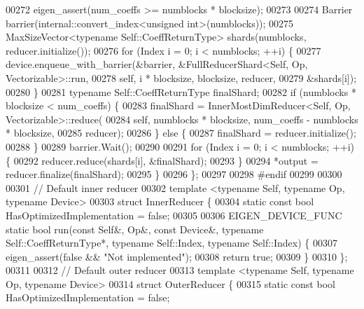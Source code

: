 \begin{DoxyCode}
00272     eigen\_assert(num\_coeffs >= numblocks * blocksize);
00273 
00274     Barrier barrier(internal::convert\_index<unsigned int>(numblocks));
00275     MaxSizeVector<typename Self::CoeffReturnType> shards(numblocks, reducer.initialize());
00276     \textcolor{keywordflow}{for} (Index i = 0; i < numblocks; ++i) \{
00277       device.enqueue\_with\_barrier(&barrier, &FullReducerShard<Self, Op, Vectorizable>::run,
00278                                   \textcolor{keyword}{self}, i * blocksize, blocksize, reducer,
00279                                   &shards[i]);
00280     \}
00281     \textcolor{keyword}{typename} Self::CoeffReturnType finalShard;
00282     \textcolor{keywordflow}{if} (numblocks * blocksize < num\_coeffs) \{
00283       finalShard = InnerMostDimReducer<Self, Op, Vectorizable>::reduce(
00284           \textcolor{keyword}{self}, numblocks * blocksize, num\_coeffs - numblocks * blocksize,
00285           reducer);
00286     \} \textcolor{keywordflow}{else} \{
00287       finalShard = reducer.initialize();
00288     \}
00289     barrier.Wait();
00290 
00291     \textcolor{keywordflow}{for} (Index i = 0; i < numblocks; ++i) \{
00292       reducer.reduce(shards[i], &finalShard);
00293     \}
00294     *output = reducer.finalize(finalShard);
00295   \}
00296 \};
00297 
00298 \textcolor{preprocessor}{#endif}
00299 
00300 
00301 \textcolor{comment}{// Default inner reducer}
00302 \textcolor{keyword}{template} <\textcolor{keyword}{typename} Self, \textcolor{keyword}{typename} Op, \textcolor{keyword}{typename} Device>
00303 \textcolor{keyword}{struct }InnerReducer \{
00304   \textcolor{keyword}{static} \textcolor{keyword}{const} \textcolor{keywordtype}{bool} HasOptimizedImplementation = \textcolor{keyword}{false};
00305 
00306   EIGEN\_DEVICE\_FUNC \textcolor{keyword}{static} \textcolor{keywordtype}{bool} run(\textcolor{keyword}{const} Self&, Op&, \textcolor{keyword}{const} Device&, \textcolor{keyword}{typename} Self::CoeffReturnType*, \textcolor{keyword}{
      typename} Self::Index, \textcolor{keyword}{typename} Self::Index) \{
00307     eigen\_assert(\textcolor{keyword}{false} && \textcolor{stringliteral}{"Not implemented"});
00308     \textcolor{keywordflow}{return} \textcolor{keyword}{true};
00309   \}
00310 \};
00311 
00312 \textcolor{comment}{// Default outer reducer}
00313 \textcolor{keyword}{template} <\textcolor{keyword}{typename} Self, \textcolor{keyword}{typename} Op, \textcolor{keyword}{typename} Device>
00314 \textcolor{keyword}{struct }OuterReducer \{
00315   \textcolor{keyword}{static} \textcolor{keyword}{const} \textcolor{keywordtype}{bool} HasOptimizedImplementation = \textcolor{keyword}{false};

\end{DoxyCode}
